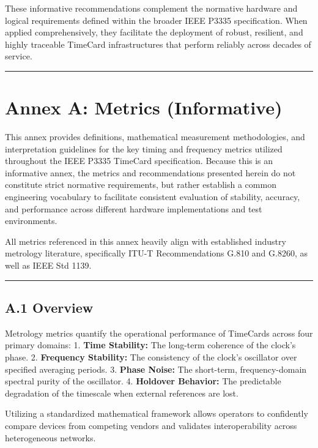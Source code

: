 \documentclass[
]{article}
\begin{document}
These informative recommendations complement the normative hardware and
logical requirements defined within the broader IEEE P3335
specification. When applied comprehensively, they facilitate the
deployment of robust, resilient, and highly traceable TimeCard
infrastructures that perform reliably across decades of service.

\begin{center}\rule{0.5\linewidth}{0.5pt}\end{center}

\section{Annex A: Metrics
(Informative)}\label{annex-a-metrics-informative}

This annex provides definitions, mathematical measurement methodologies,
and interpretation guidelines for the key timing and frequency metrics
utilized throughout the IEEE P3335 TimeCard specification. Because this
is an informative annex, the metrics and recommendations presented
herein do not constitute strict normative requirements, but rather
establish a common engineering vocabulary to facilitate consistent
evaluation of stability, accuracy, and performance across different
hardware implementations and test environments.

All metrics referenced in this annex heavily align with established
industry metrology literature, specifically ITU-T Recommendations G.810
and G.8260, as well as IEEE Std 1139.

\begin{center}\rule{0.5\linewidth}{0.5pt}\end{center}

\subsection{A.1 Overview}\label{a.1-overview}

Metrology metrics quantify the operational performance of TimeCards
across four primary domains: 1. \textbf{Time Stability:} The long-term
coherence of the clock's phase. 2. \textbf{Frequency Stability:} The
consistency of the clock's oscillator over specified averaging periods.
3. \textbf{Phase Noise:} The short-term, frequency-domain spectral
purity of the oscillator. 4. \textbf{Holdover Behavior:} The predictable
degradation of the timescale when external references are lost.

Utilizing a standardized mathematical framework allows operators to
confidently compare devices from competing vendors and validates
interoperability across heterogeneous networks.
\end{document}
